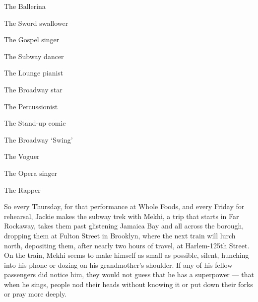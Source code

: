\href{https://www.nytimes3xbfgragh.onion/interactive/2019/05/30/magazine/dance-ballet-new-york.html}{}

The Ballerina

\href{https://www.nytimes3xbfgragh.onion/interactive/2019/05/30/magazine/sword-swallowing-new-york.html}{}

The Sword swallower

\href{https://www.nytimes3xbfgragh.onion/interactive/2019/05/30/magazine/gospel-singer-new-york.html}{}

The Gospel singer

\href{https://www.nytimes3xbfgragh.onion/interactive/2019/05/30/magazine/subway-dance-new-york.html}{}

The Subway dancer

\href{https://www.nytimes3xbfgragh.onion/interactive/2019/05/30/magazine/earl-rose-piano-carlyle-new-york.html}{}

The Lounge pianist

\href{https://www.nytimes3xbfgragh.onion/interactive/2019/05/30/magazine/broadway-kiss-me-kate.html}{}

The Broadway star

\href{https://www.nytimes3xbfgragh.onion/interactive/2019/05/30/magazine/latin-beat-new-york.html}{}

The Percussionist

\href{https://www.nytimes3xbfgragh.onion/interactive/2019/05/30/magazine/female-comedy-new-york.html}{}

The Stand-up comic

\href{https://www.nytimes3xbfgragh.onion/interactive/2019/05/30/magazine/aladdin-musical-new-york.html}{}

The Broadway `Swing'

\href{https://www.nytimes3xbfgragh.onion/interactive/2019/05/30/magazine/vogue-kiki-new-york.html}{}

The Voguer

\href{https://www.nytimes3xbfgragh.onion/interactive/2019/05/30/magazine/metropolitan-opera-singer-new-york.html}{}

The Opera singer

\href{https://www.nytimes3xbfgragh.onion/interactive/2019/05/30/magazine/princess-nokia-new-york.html}{}

The Rapper

So every Thursday, for that performance at Whole Foods, and every Friday
for rehearsal, Jackie makes the subway trek with Mekhi, a trip that
starts in Far Rockaway, takes them past glistening Jamaica Bay and all
across the borough, dropping them at Fulton Street in Brooklyn, where
the next train will lurch north, depositing them, after nearly two hours
of travel, at Harlem-125th Street. On the train, Mekhi seems to make
himself as small as possible, silent, hunching into his phone or dozing
on his grandmother's shoulder. If any of his fellow passengers did
notice him, they would not guess that he has a superpower --- that when
he sings, people nod their heads without knowing it or put down their
forks or pray more deeply.

